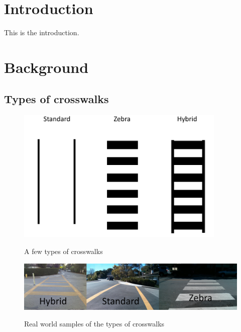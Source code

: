 \documentclass[12pt]{ucthesis}
\newcommand{\captionfonts}{\small\bf\ssp}
\begin{document}
\pagestyle{plain}




\renewcommand{\baselinestretch}{1.66}







\chapter{Introduction}
\label{intro}


This is the introduction.

\chapter{Background}
\section{Types of crosswalks}

\begin{figure}
\begin{center}
\includegraphics[width=10cm]{TypesOfXwalks.png}
\captionfonts
\caption[This is a figure]{A few types of crosswalks}
\label{fig:TypesOfXwalksFig}
\end{center}
\end{figure}

\begin{figure}
\begin{center}
\includegraphics[width=13cm]{All3Types.jpg}
\captionfonts
\caption[This is a figure]{Real world samples of the types of crosswalks}
\label{fig:TypesOfXwalksRealFig}
\end{center}
\end{figure}
\end{document}
